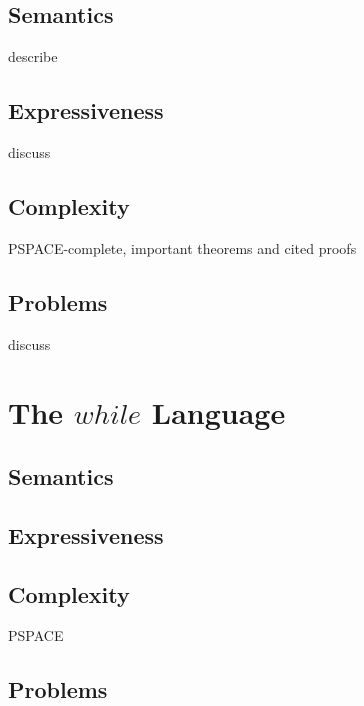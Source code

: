 \documentclass[11pt]{article}
\begin{document}
\subsection{Semantics}
describe
\subsection{Expressiveness}
discuss
\subsection{Complexity}
PSPACE-complete,
important theorems and cited proofs
\subsection{Problems}
discuss

\section{The $while$ Language}
\subsection{Semantics}
\subsection{Expressiveness}
\subsection{Complexity}
PSPACE
\subsection{Problems}


\end{document}
